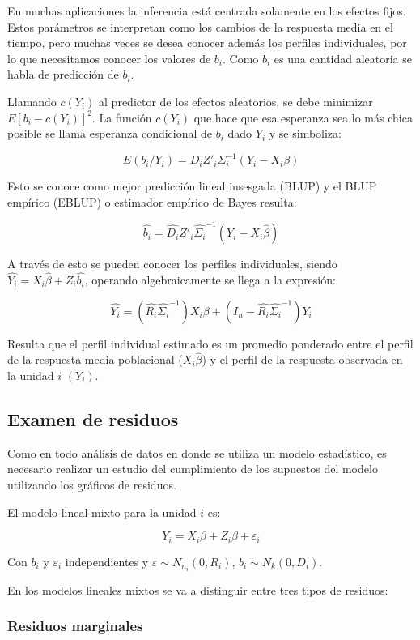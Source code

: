 \documentclass[12pt]{article}
\begin{document}
En muchas aplicaciones la inferencia está centrada solamente en los efectos fijos. Estos parámetros se interpretan como
los cambios de la respuesta media en el tiempo, pero muchas veces se desea conocer además los perfiles individuales, por
lo que necesitamos conocer los valores de $b_i$. Como $b_i$ es una cantidad aleatoria se habla de predicción de $b_i$.

Llamando $c(Y_i)$ al predictor de los efectos aleatorios, se debe minimizar $E[b_i - c(Y_i)]^2$. La función $c(Y_i)$
que hace que esa esperanza sea lo más chica posible se llama esperanza condicional de $b_i$ dado $Y_i$ y se simboliza:

\[ E(b_i/Y_i) = D_iZ'_i\varSigma_i^{-1} (Y_i - X_i\beta) \]

Esto se conoce como mejor predicción lineal insesgada (BLUP) y el BLUP empírico (EBLUP) o estimador empírico de Bayes
resulta:

\[ \hat{b_i} = \hat{D_i}Z'_i\hat{\varSigma_i}^{-1} (Y_i - X_i\hat{\beta}) \]

A través de esto se pueden conocer los perfiles individuales, siendo $\hat{Y_i} = X_i\hat{\beta} + Z_i\hat{b_i}$,
operando algebraicamente se llega a la expresión:

\[ \hat{Y_i} = (\hat{R_i}\hat{\varSigma_i}^{-1}) X_i\beta + (I_n - \hat{R_i}\hat{\varSigma_i}^{-1}) Y_i \]

Resulta que el perfil individual estimado es un promedio ponderado entre el perfil de la respuesta media poblacional
($X_i\hat{\beta}$) y el perfil de la respuesta observada en la unidad $i$ $(Y_i)$.

\subsection{Examen de residuos}

Como en todo análisis de datos en donde se utiliza un modelo estadístico, es necesario realizar un estudio del
cumplimiento de los supuestos del modelo utilizando los gráficos de residuos.

El modelo lineal mixto para la unidad $i$ es:

\[ Y_i = X_i\beta + Z_i\beta + \varepsilon_i \]

Con $b_i$ y $\varepsilon_i$ independientes y $\varepsilon \sim N_{n_i}(0, R_i)$, $b_i \sim N_k(0, D_i)$.

En los modelos lineales mixtos se va a distinguir entre tres tipos de residuos:

\subsubsection{Residuos marginales}
\end{document}
